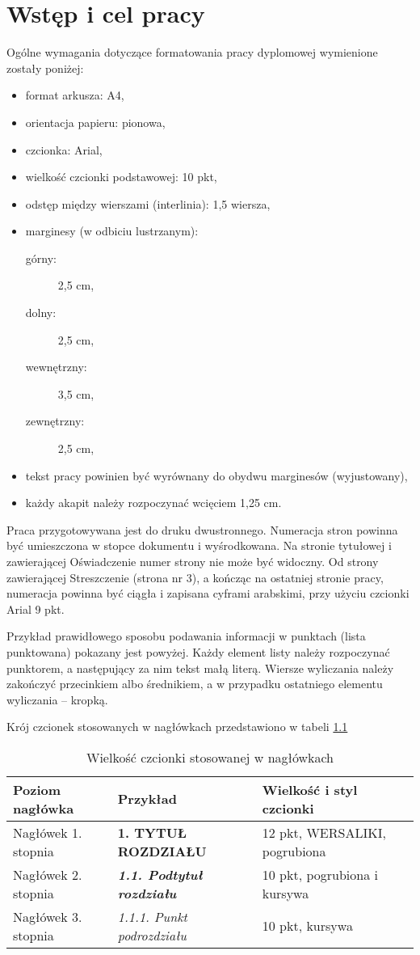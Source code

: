\chapter{Wstęp i cel pracy}
\label{chap:wstep}

Ogólne wymagania dotyczące formatowania pracy dyplomowej wymienione zostały poniżej:
\begin{itemize}
\item	format arkusza: A4,
\item	orientacja papieru: pionowa,
\item	czcionka: Arial,
\item	wielkość czcionki podstawowej: 10 pkt,
\item	odstęp między wierszami (interlinia): 1,5 wiersza,
\item	marginesy (w odbiciu lustrzanym):
\begin{description}
\item[górny:] 2,5 cm,
\item[dolny:] 2,5 cm,
\item[wewnętrzny:] 3,5 cm,
\item[zewnętrzny:] 2,5 cm,
\end{description}
\item	tekst pracy powinien być wyrównany do obydwu marginesów (wyjustowany),
\item	każdy akapit należy rozpoczynać wcięciem 1,25 cm.
\end{itemize}
Praca przygotowywana jest do druku dwustronnego. Numeracja stron powinna być umieszczona w stopce dokumentu i wyśrodkowana. Na stronie tytułowej i zawierającej Oświadczenie numer strony nie może być widoczny. Od strony zawierającej Streszczenie (strona nr 3), a kończąc na ostatniej stronie pracy, numeracja powinna być ciągła i zapisana cyframi arabskimi, przy użyciu czcionki Arial 9 pkt.

Przykład prawidłowego sposobu podawania informacji w punktach (lista punktowana) pokazany jest powyżej. Każdy element listy należy rozpoczynać punktorem, a następujący za nim tekst małą literą. Wiersze wyliczania należy zakończyć przecinkiem albo średnikiem, a w przypadku ostatniego elementu wyliczania – kropką. 

Krój czcionek stosowanych w nagłówkach przedstawiono w tabeli \ref{tab:font_size}

\begin{table}[!ht]
\caption{Wielkość czcionki stosowanej w nagłówkach}
\label{tab:font_size}
\small
\begin{tabular}{|p{}|p{}|p{}|}
\hline
Poziom nagłówka &	Przykład &	Wielkość i styl czcionki\\ \hline
Nagłówek 1. stopnia	& \textbf{1. TYTUŁ ROZDZIAŁU} &	12 pkt, WERSALIKI, pogrubiona \\ \hline
Nagłówek 2. stopnia	& \textbf\textit{1.1. Podtytuł rozdziału} &	10 pkt, pogrubiona i kursywa \\ \hline
Nagłówek 3. stopnia	 & \textit{1.1.1. Punkt podrozdziału}	 & 10 pkt, kursywa \\ \hline
\end{tabular}
\end{table}
	
